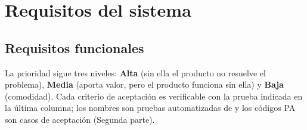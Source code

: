 \section{Requisitos del sistema}

\subsection{Requisitos funcionales}

La prioridad sigue tres niveles: \textbf{Alta} (sin ella el producto no resuelve el problema), \textbf{Media} (aporta valor, pero el producto funciona sin ella) y \textbf{Baja} (comodidad). Cada criterio de aceptación es verificable con la prueba indicada en la última columna; los nombres  son pruebas automatizadas de  y los códigos PA son casos de aceptación (Segunda parte).

